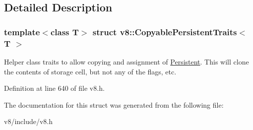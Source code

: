 \subsection{Detailed Description}
\subsubsection*{template$<$class T$>$\newline
struct v8\+::\+Copyable\+Persistent\+Traits$<$ T $>$}

Helper class traits to allow copying and assignment of \mbox{\hyperlink{classv8_1_1Persistent}{Persistent}}. This will clone the contents of storage cell, but not any of the flags, etc. 

Definition at line 640 of file v8.\+h.



The documentation for this struct was generated from the following file\+:\begin{DoxyCompactItemize}
\item 
v8/include/v8.\+h\end{DoxyCompactItemize}
